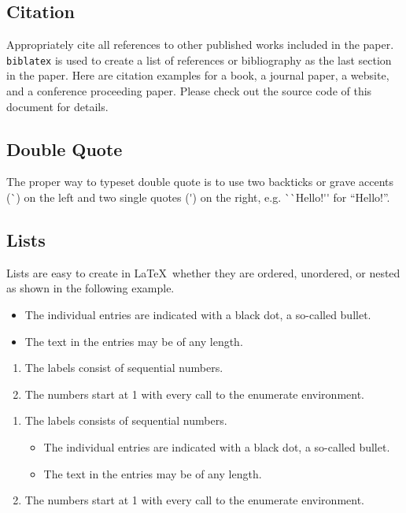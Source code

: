 \documentclass{article}
\begin{document}
\subsection{Citation}
Appropriately cite all references to other published works included in the paper.
\texttt{biblatex} is used to create a list of references or bibliography as the
last section in the paper. Here are citation examples for a
book\cite{latexcompanion}, a journal paper\cite{einstein}, a
website\cite{knuthwebsite}, and a conference proceeding paper\cite{maurer}.
Please check out the source code of this document for details.

\subsection{Double Quote}
The proper way to typeset double quote is to use two backticks or grave accents
(\`{}) on the left and two single quotes (\'{}) on the right, e.g.
\`{}\`{}Hello!\'{}\'{} for ``Hello!''.

\subsection{Lists}
Lists are easy to create in  \LaTeX\ whether they are ordered, unordered, or
nested as shown in the following example.

\begin{itemize}[noitemsep]
  \item The individual entries are indicated with a black dot, a so-called bullet.
  \item The text in the entries may be of any length.
\end{itemize}

\begin{enumerate}[noitemsep]
  \item The labels consist of sequential numbers.
  \item The numbers start at 1 with every call to the enumerate environment.
\end{enumerate}

\begin{enumerate}[noitemsep]
   \item The labels consists of sequential numbers.
   \begin{itemize}[noitemsep]
     \item The individual entries are indicated with a black dot, a so-called bullet.
     \item The text in the entries may be of any length.
   \end{itemize}
   \item The numbers start at 1 with every call to the enumerate environment.
\end{enumerate}
\end{document}
